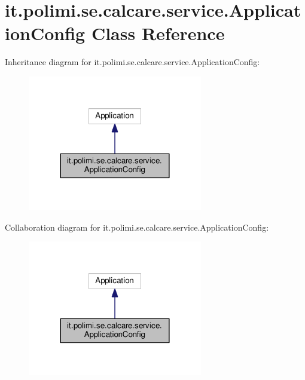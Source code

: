 \hypertarget{classit_1_1polimi_1_1se_1_1calcare_1_1service_1_1ApplicationConfig}{}\section{it.\+polimi.\+se.\+calcare.\+service.\+Application\+Config Class Reference}
\label{classit_1_1polimi_1_1se_1_1calcare_1_1service_1_1ApplicationConfig}


Inheritance diagram for it.\+polimi.\+se.\+calcare.\+service.\+Application\+Config\+:
\nopagebreak
\begin{figure}[H]
\begin{center}
\leavevmode
\includegraphics[width=216pt]{classit_1_1polimi_1_1se_1_1calcare_1_1service_1_1ApplicationConfig__inherit__graph}
\end{center}
\end{figure}


Collaboration diagram for it.\+polimi.\+se.\+calcare.\+service.\+Application\+Config\+:
\nopagebreak
\begin{figure}[H]
\begin{center}
\leavevmode
\includegraphics[width=216pt]{classit_1_1polimi_1_1se_1_1calcare_1_1service_1_1ApplicationConfig__coll__graph}
\end{center}
\end{figure}
